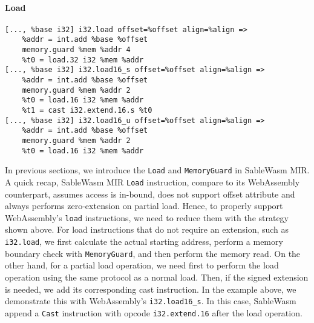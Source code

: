 \paragraph{Load} \quad
\begin{lstlisting}[basicstyle=\linespread{1}\small, language=SableWasmMIR]
[..., %base i32] i32.load offset=%offset align=%align =>
    %addr = int.add %base %offset
    memory.guard %mem %addr 4
    %t0 = load.32 i32 %mem %addr
[..., %base i32] i32.load16_s offset=%offset align=%align =>
    %addr = int.add %base %offset
    memory.guard %mem %addr 2
    %t0 = load.16 i32 %mem %addr
    %t1 = cast i32.extend.16.s %t0
[..., %base i32] i32.load16_u offset=%offset align=%align =>
    %addr = int.add %base %offset
    memory.guard %mem %addr 2
    %t0 = load.16 i32 %mem %addr
\end{lstlisting}
In previous sections, we introduce the \texttt{Load} and \texttt{MemoryGuard} in SableWasm MIR. A quick recap, SableWasm MIR \texttt{Load} instruction, compare to its WebAssembly counterpart, assumes access is in-bound, does not support offset attribute and always performs zero-extension on partial load. Hence, to properly support WebAssembly's \texttt{load} instructions, we need to reduce them with the strategy shown above. For load instructions that do not require an extension, such as \texttt{i32.load}, we first calculate the actual starting address, perform a memory boundary check with \texttt{MemoryGuard}, and then perform the memory read. On the other hand, for a partial load operation, we need first to perform the load operation using the same protocol as a normal load. Then, if the signed extension is needed, we add its corresponding cast instruction. In the example above, we demonstrate this with WebAssembly's \texttt{i32.load16\_s}. In this case, SableWasm append a \texttt{Cast} instruction with opcode \texttt{i32.extend.16} after the load operation.


